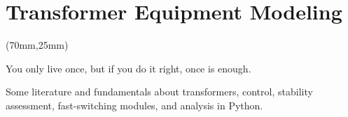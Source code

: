 




\chapter{Transformer Equipment Modeling}

\begin{textblock*}{.7\textwidth}(70mm,25mm)
        \begin{fquote}
                You only live once, but if you do it right, once is enough.
        \end{fquote}
\end{textblock*}

Some literature and fundamentals about transformers, control, stability assessment, fast-switching modules, and analysis in Python. 



